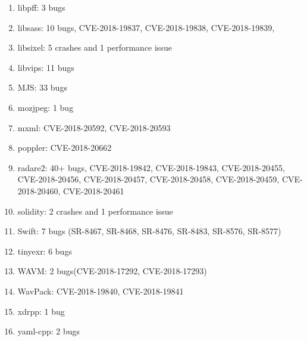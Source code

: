 \documentclass[paper=a4,fontsize=11pt]{scrartcl} %
\begin{document}
\begin{enumerate}
    \item libpff: 3 bugs
    \item libsass: 10 bugs, CVE-2018-19837, CVE-2018-19838, CVE-2018-19839,
    \item libsixel: 5 crashes and 1 performance issue
    \item libvips: 11 bugs
    \item MJS: 33 bugs
    \item mozjpeg: 1 bug
    \item mxml: CVE-2018-20592, CVE-2018-20593
    \item poppler: CVE-2018-20662
    \item radare2: 40+ bugs, CVE-2018-19842, CVE-2018-19843, CVE-2018-20455, CVE-2018-20456, CVE-2018-20457, CVE-2018-20458, CVE-2018-20459, CVE-2018-20460, CVE-2018-20461
    \item solidity: 2 crashes and 1 performance issue
    \item Swift: 7 bugs (SR-8467, SR-8468, SR-8476, SR-8483, SR-8576, SR-8577)
    \item tinyexr: 6 bugs
    \item WAVM: 2 bugs(CVE-2018-17292, CVE-2018-17293)
    \item WavPack: CVE-2018-19840, CVE-2018-19841
    \item xdrpp: 1 bug
    \item yaml-cpp: 2 bugs
\end{enumerate}


 

\end{document}
